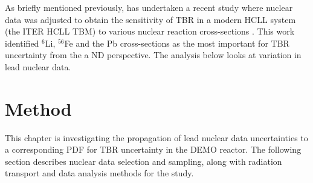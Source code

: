 

As briefly mentioned previously, \citeauthor{Leichtle2011} has undertaken a recent study where nuclear data was adjusted to obtain the sensitivity of TBR in a modern HCLL system (the ITER HCLL TBM) to various nuclear reaction cross-sections \cite{Leichtle2011}. This work identified $^{6}$Li, $^{56}$Fe and the Pb cross-sections as the most important for TBR uncertainty from the a ND perspective. The analysis below looks at variation in lead nuclear data. 

\FloatBarrier

\FloatBarrier
\section{Method}
This chapter is investigating the propagation of lead nuclear data uncertainties to a corresponding PDF for TBR uncertainty in the DEMO reactor. The following section describes nuclear data selection and sampling, along with radiation transport and data analysis methods for the study.

